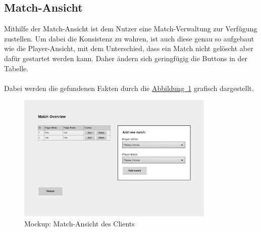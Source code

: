 \subsection{Match-Ansicht}\label{sec:matchView}
Mithilfe der Match-Ansicht ist dem Nutzer eine Match-Verwaltung zur Verfügung zustellen. Um dabei die Konsistenz zu wahren, ist auch diese genau so aufgebaut wie die Player-Ansicht, mit dem Unterschied, dass ein Match nicht gelöscht aber dafür gestartet werden kann. Daher ändern sich geringfügig die Buttons in der Tabelle.\\
\\
Dabei werden die gefundenen Fakten durch die \hyperref[fig:matchView]{Abbildung~\ref{fig:matchView}} grafisch dargestellt.
\begin{figure}[htb]
	\includegraphics[width=0.84\textwidth]{images/match-view.png}
	\caption{Mockup: Match-Ansicht des Clients}
	\label{fig:matchView}
\end{figure}

